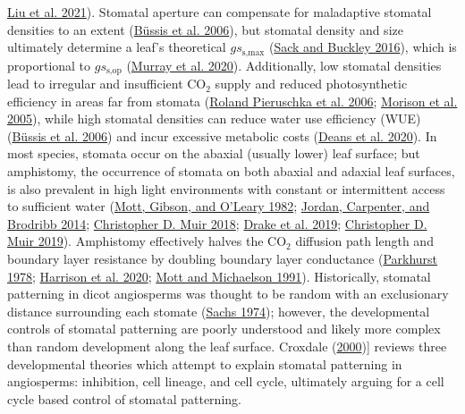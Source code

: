 \documentclass[12pt,halfline,a4paper,]{ouparticle}
\begin{document}
\protect\hyperlink{ref-liu_scaling_2021}{Liu et al. 2021}). Stomatal
aperture can compensate for maladaptive stomatal densities to an extent
(\protect\hyperlink{ref-bussis_stomatal_2006}{Büssis et al. 2006}), but
stomatal density and size ultimately determine a leaf's theoretical
\(gs_\text{s,max}\)
(\protect\hyperlink{ref-sack_developmental_2016}{Sack and Buckley
2016}), which is proportional to \(gs_\text{s,op}\)
(\protect\hyperlink{ref-murray_consistent_2020}{Murray et al. 2020}).
Additionally, low stomatal densities lead to irregular and insufficient
CO\(_2\) supply and reduced photosynthetic efficiency in areas far from
stomata (\protect\hyperlink{ref-pieruschka_lateral_2006}{Roland
Pieruschka et al. 2006};
\protect\hyperlink{ref-morison_lateral_2005}{Morison et al. 2005}),
while high stomatal densities can reduce water use efficiency (WUE)
(\protect\hyperlink{ref-bussis_stomatal_2006}{Büssis et al. 2006}) and
incur excessive metabolic costs
(\protect\hyperlink{ref-deans_optimization_2020}{Deans et al. 2020}). In
most species, stomata occur on the abaxial (usually lower) leaf surface;
but amphistomy, the occurrence of stomata on both abaxial and adaxial
leaf surfaces, is also prevalent in high light environments with
constant or intermittent access to sufficient water
(\protect\hyperlink{ref-mott_adaptive_1982}{Mott, Gibson, and O'Leary
1982}; \protect\hyperlink{ref-jordan_using_2014}{Jordan, Carpenter, and
Brodribb 2014}; \protect\hyperlink{ref-muir_light_2018}{Christopher D.
Muir 2018}; \protect\hyperlink{ref-drake_two_2019}{Drake et al. 2019};
\protect\hyperlink{ref-muir_is_2019}{Christopher D. Muir 2019}).
Amphistomy effectively halves the CO\(_2\) diffusion path length and
boundary layer resistance by doubling boundary layer conductance
(\protect\hyperlink{ref-parkhurst_adaptive_1978}{Parkhurst 1978};
\protect\hyperlink{ref-harrison_influence_2020}{Harrison et al. 2020};
\protect\hyperlink{ref-mott_amphistomy_1991}{Mott and Michaelson 1991}).
Historically, stomatal patterning in dicot angiosperms was thought to be
random with an exclusionary distance surrounding each stomate
(\protect\hyperlink{ref-sachs_developmental_1974}{Sachs 1974}); however,
the developmental controls of stomatal patterning are poorly understood
and likely more complex than random development along the leaf surface.
Croxdale (\protect\hyperlink{ref-croxdale_stomatal_2000}{2000}){]}
reviews three developmental theories which attempt to explain stomatal
patterning in angiosperms: inhibition, cell lineage, and cell cycle,
ultimately arguing for a cell cycle based control of stomatal
patterning.
\end{document}
